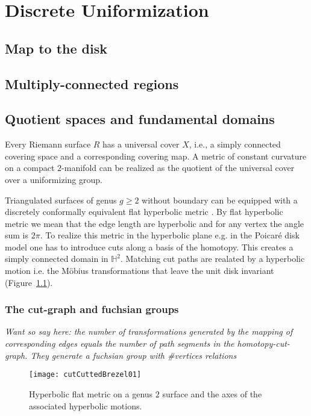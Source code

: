 \documentclass[Thesis.tex]{subfiles}
\begin{document}
\chapter{Discrete Uniformization}
\label{chp:uniformization}

\section{Map to the disk}
\label{sec:disk_mapping}

\section{Multiply-connected regions}
\label{sec:multiply_connected_regions}

\section{Quotient spaces and fundamental domains}

Every Riemann surface $R$ has a universal cover $X$, i.e., a simply connected covering space and a corresponding covering map. A metric of constant curvature on a compact $2$-manifold can be realized as the quotient of the universal cover over a uniformizing group.

Triangulated surfaces of genus $g\geq 2$ without boundary can be equipped with a discretely conformally equivalent flat hyperbolic metric \cite{Bobenko2010}. By flat hyperbolic metric we mean that the edge length are hyperbolic and for any vertex the angle sum is $2\pi$. To realize this metric in the hyperbolic plane e.g. in the Poicar\'e disk model one has to introduce cuts along a basis of the homotopy. This creates a simply connected domain in $\mathbb H^2$. Matching cut paths are realated by a hyperbolic motion i.e. the M\"obius transformations that leave the unit disk invariant (Figure~\ref{fig:axes_of_motion}).

\subsection{The cut-graph and fuchsian groups}
\emph{Want so say here: the number of transformations generated by the mapping of corresponding edges equals the number of path segments in the homotopy-cut-graph. They generate a fuchsian group with \#vertices relations}


\begin{figure}
\centering
\texttt{[image: cutCuttedBrezel01]}
\caption{Hyperbolic flat metric on a genus $2$ surface and the axes of the associated hyperbolic motions.}
\label{fig:axes_of_motion}
\end{figure}
\end{document}
